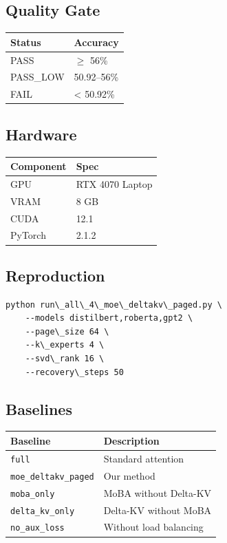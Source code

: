\subsection{Quality Gate}

\begin{table}[H]
\centering
\small
\begin{tabular}{ll}
\toprule
\textbf{Status} & \textbf{Accuracy} \\
\midrule
PASS & $\ge$ 56\% \\
PASS\_LOW & 50.92--56\% \\
FAIL & \textless{} 50.92\% \\
\bottomrule
\end{tabular}
\end{table}

\subsection{Hardware}

\begin{table}[H]
\centering
\small
\begin{tabular}{ll}
\toprule
\textbf{Component} & \textbf{Spec} \\
\midrule
GPU & RTX 4070 Laptop \\
VRAM & 8 GB \\
CUDA & 12.1 \\
PyTorch & 2.1.2 \\
\bottomrule
\end{tabular}
\end{table}

\subsection{Reproduction}

\begin{lstlisting}
python run\_all\_4\_moe\_deltakv\_paged.py \
    --models distilbert,roberta,gpt2 \
    --page\_size 64 \
    --k\_experts 4 \
    --svd\_rank 16 \
    --recovery\_steps 50
\end{lstlisting}

\subsection{Baselines}

\begin{table}[H]
\centering
\small
\begin{tabular}{ll}
\toprule
\textbf{Baseline} & \textbf{Description} \\
\midrule
\texttt{full} & Standard attention \\
\texttt{moe\_deltakv\_paged} & Our method \\
\texttt{moba\_only} & MoBA without Delta-KV \\
\texttt{delta\_kv\_only} & Delta-KV without MoBA \\
\texttt{no\_aux\_loss} & Without load balancing \\
\bottomrule
\end{tabular}
\end{table}

